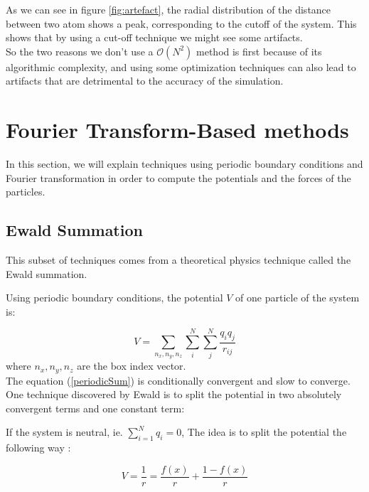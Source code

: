 \documentclass[11pt,twoside,a4paper]{report}
\begin{document}
As we can see in figure \ref{fig:artefact},  the radial distribution of the distance between two atom shows a peak, corresponding to the cutoff of the system. This shows that by using a cut-off technique we might see some artifacts.\\

So the two reasons we don't use a $\mathcal{O}(N^2)$ method is first because of its algorithmic complexity, and using some optimization techniques can also lead to artifacts that are detrimental to the accuracy of the simulation.





\section{Fourier Transform-Based methods}

In this section, we will explain techniques using periodic boundary conditions and Fourier transformation in order to compute the potentials and the forces of the particles.

\subsection{Ewald Summation}

This subset of techniques comes from a theoretical physics technique called the Ewald summation.

Using periodic boundary conditions, the potential $V$ of one particle of the system is:

\begin{equation}
	V = \sum_{n_x,n_y,n_z} \sum_{i}^{N} \sum_{j}^{N} \frac{q_i q_j}{r_{ij}}
	\label{periodicSum}
\end{equation}
where $n_x,n_y,n_z$ are the box index vector.\\

The equation (\ref{periodicSum}) is conditionally convergent and slow to converge. One technique discovered by Ewald is to split the potential in two absolutely convergent terms and one constant term:


If the system is neutral, ie. $\sum_{i=1}^N q_i = 0$, The idea is to split the potential the following way :

\begin{equation}
    V = \frac{1}{r} = \frac{f(x)}{r} + \frac{1 - f(x)}{r}
\end{equation}
\end{document}
